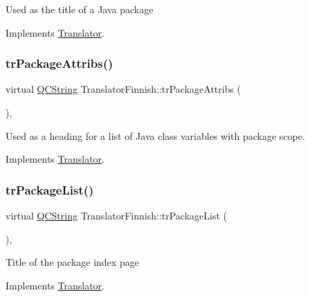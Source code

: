 Used as the title of a Java package 

Implements \mbox{\hyperlink{class_translator}{Translator}}.

\mbox{\label{class_translator_finnish_ada5f824ae0f2ec65d3ae8f87be70a6ac}} 
\subsubsection{\texorpdfstring{trPackageAttribs()}{trPackageAttribs()}}
{\footnotesize\ttfamily virtual \mbox{\hyperlink{class_q_c_string}{Q\+C\+String}} Translator\+Finnish\+::tr\+Package\+Attribs (\begin{DoxyParamCaption}{ }\end{DoxyParamCaption})\hspace{0.3cm}{\ttfamily [inline]}, {\ttfamily [virtual]}}

Used as a heading for a list of Java class variables with package scope. 

Implements \mbox{\hyperlink{class_translator}{Translator}}.

\mbox{\label{class_translator_finnish_a150ff2aa8d82c2f8ae4846ad40c4fb12}} 
\subsubsection{\texorpdfstring{trPackageList()}{trPackageList()}}
{\footnotesize\ttfamily virtual \mbox{\hyperlink{class_q_c_string}{Q\+C\+String}} Translator\+Finnish\+::tr\+Package\+List (\begin{DoxyParamCaption}{ }\end{DoxyParamCaption})\hspace{0.3cm}{\ttfamily [inline]}, {\ttfamily [virtual]}}

Title of the package index page 

Implements \mbox{\hyperlink{class_translator}{Translator}}.

\mbox{\label{class_translator_finnish_a1296fe8649ed4156db04ad1e233a8440}} 
